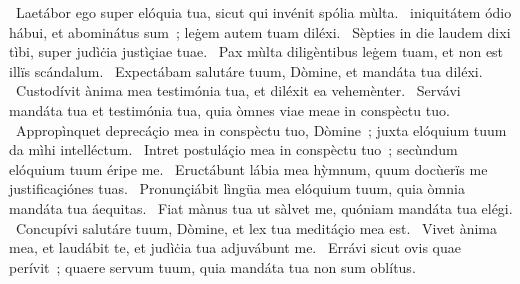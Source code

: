 {~Laetábor ego super elóquia tua, sicut qui invénit spólia mùlta.
~iniquitátem ódio hábui, et abominátus sum~; leġem autem tuam diléxi.
~Sèpties in die laudem dixi tìbi, super judìċia justìçiae tuae.
~Pax mùlta diligèntibus leġem tuam, et non est illïs scándalum.
~Expectábam salutáre tuum, Dòmine, et mandáta tua diléxi.
~Custodívit ànima mea testimónia tua, et diléxit ea vehemènter.
~Servávi mandáta tua et testimónia tua, quia òmnes viae meae in conspèctu tuo.
~Appropìnquet deprecáçio mea in conspèctu tuo, Dòmine~; juxta elóquium tuum da mìhi intelléctum.
~Intret postuláçio mea in conspèctu tuo~; secùndum elóquium tuum éripe me.
~Eructábunt lábia mea hỳmnum, quum docùerïs me justificaçiónes tuas.
~Pronunçiábit lìngüa mea elóquium tuum, quia òmnia mandáta tua áequitas.
~Fiat mànus tua ut sàlvet me, quóniam mandáta tua elégi.
~Concupívi salutáre tuum, Dòmine, et lex tua meditáçio mea est.
~Vivet ànima mea, et laudábit te, et judìċia tua adjuvábunt me.
~Errávi sicut ovis quae perívit~; quaere servum tuum, quia mandáta tua non sum oblítus.
}
